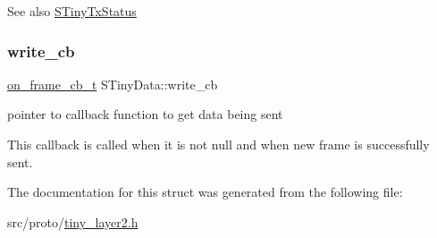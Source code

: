 \begin{DoxySeeAlso}{See also}
\hyperlink{structSTinyTxStatus}{S\+Tiny\+Tx\+Status} 
\end{DoxySeeAlso}
\mbox{\label{structSTinyData_ada334c88e86bfd2c10191f65818c3fb3}} 
\subsubsection{\texorpdfstring{write\+\_\+cb}{write\_cb}}
{\footnotesize\ttfamily \hyperlink{tiny__proto__types_8h_ad6bf709565b8aecb9e6ecf196f219d54}{on\+\_\+frame\+\_\+cb\+\_\+t} S\+Tiny\+Data\+::write\+\_\+cb}



pointer to callback function to get data being sent 

This callback is called when it is not null and when new frame is successfully sent. 

The documentation for this struct was generated from the following file\+:\begin{DoxyCompactItemize}
\item 
src/proto/\hyperlink{tiny__layer2_8h}{tiny\+\_\+layer2.\+h}\end{DoxyCompactItemize}
